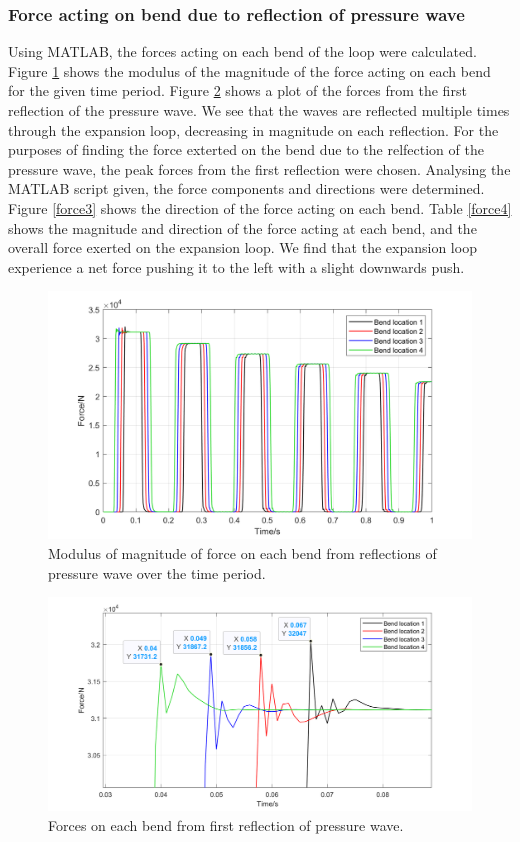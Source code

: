 \subsubsection{Force acting on bend due to reflection of pressure wave}
Using MATLAB, the forces acting on each bend of the loop were calculated. Figure \ref{force2} shows the modulus of the magnitude of the force acting on each bend for the given time period. Figure \ref{force1} shows a plot of the forces from the first reflection of the pressure wave. We see that the waves are reflected multiple times through the expansion loop, decreasing in magnitude on each reflection. For the purposes of finding the force exterted on the bend due to the relfection of the pressure wave, the peak forces from the first reflection were chosen. Analysing the MATLAB script given, the force components and directions were determined. Figure \ref{force3} shows the direction of the force acting on each bend. Table \ref{force4} shows the magnitude and direction of the force acting at each bend, and the overall force exerted on the expansion loop. We find that the expansion loop experience a net force pushing it to the left with a slight downwards push. 

\begin{figure}[H]
    \centering
    \includegraphics[width = 0.9 \textwidth]{img/fig6.png}
    \caption{Modulus of magnitude of force on each bend from reflections of pressure wave over the time period.}
    \label{force2}
\end{figure}

\begin{figure}[H]
    \centering
    \includegraphics[width = 0.9 \textwidth]{img/fig5.png}
    \caption{Forces on each bend from first reflection of pressure wave.}
    \label{force1}
\end{figure}

